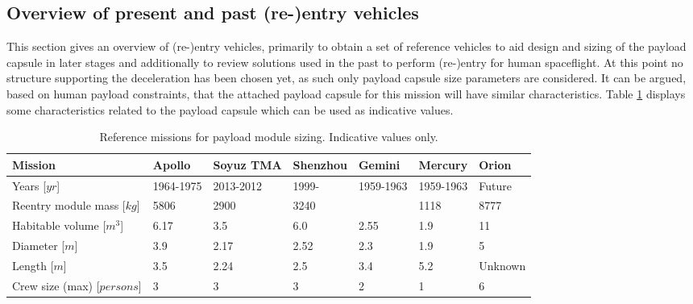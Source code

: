 \subsection{Overview of present and past (re-)entry vehicles}\label{cha:past missions}
This section gives an overview of (re-)entry vehicles, primarily to obtain a set of reference vehicles to aid design and sizing of the payload capsule in later stages and additionally to review solutions used in the past to perform (re-)entry for human spaceflight. At this point no structure supporting the deceleration has been chosen yet, as such only payload capsule size parameters are considered. It can be argued, based on human payload constraints, that the attached payload capsule for this mission will have similar characteristics. Table \ref{tab:refmis} displays some characteristics related to the payload capsule which can be used as indicative values. 


\begin{table}[H]
	\caption[Reference missions for payload module sizing]{Reference missions for payload module sizing. Indicative values only.}
		\begin{tabular}{|p{}|p{}|p{}|p{}|p{}|p{}|p{}|} %
			\hline
			Mission 						& Apollo & 	Soyuz TMA &	Shenzhou & Gemini & Mercury & Orion \\ \hline \hline
			Years [$yr$]						  	&	1964-1975	& 	2013-2012 &	1999- &   1959-1963  & 1959-1963 & Future \\ \hline
			Reentry module mass [$kg$]  	&	5806& 	2900 &	3240 &     & 1118 & 8777 \\ \hline
			Habitable volume [$m^3$]		&	6.17& 	3.5  &	6.0  & 2.55 & 1.9 & 11   \\ \hline
			Diameter [$m$]			 		&	3.9 & 	2.17  &	2.52 & 2.3 & 1.9 & 5   \\ \hline
			Length  [$m$]			 		&	3.5 & 	2.24  &	2.5  & 3.4 &  5.2 & Unknown  \\ \hline
			Crew size (max) [$persons$]		&	3   & 	3     &	3    & 2   &  1   & 6   \\ \hline
		\end{tabular}
    \label{tab:refmis}
\end{table}



